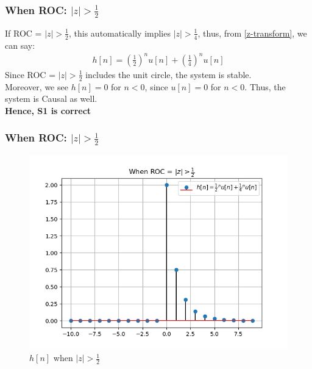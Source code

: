 \documentclass{beamer}
\providecommand{\brak}[1]{\ensuremath{\left(#1\right)}}
\providecommand{\abs}[1]{\left\vert#1\right\vert}
\begin{document}
\begin{frame}
    \frametitle{When ROC: $\abs{z} > \frac{1}{2}$}
    \begin{flushleft}
   If ROC = $\abs{z}>\frac{1}{2}$, this automatically implies $\abs{z} > \frac{1}{4}$, thus, from \eqref{z-transform}, we can say:
\begin{align}
    h[n] = \brak{\frac{1}{2}}^n u[n] + \brak{\frac{1}{4}}^n u[n] 
\end{align}
Since ROC = $\abs{z}>\frac{1}{2}$ includes the unit circle, the system is stable.\\
Moreover, we see $h[n] = 0 $
 for $n < 0$, since $u[n] = 0$ for $n< 0$. Thus, the system is Causal as well.\\\textbf{Hence, S1 is correct}\\
    \end{flushleft}
\end{frame}

\begin{frame}
    \frametitle{When ROC: $\abs{z} > \frac{1}{2}$}
    \begin{flushleft}
   \begin{figure}[!ht]
\centering
 \includegraphics[width=\columnwidth]{graphs/S1.png}
 \caption{$h[n]$ when $\abs{z} > \frac{1}{2}$}
 \end{figure}    \end{flushleft}
\end{frame}
\end{document}
